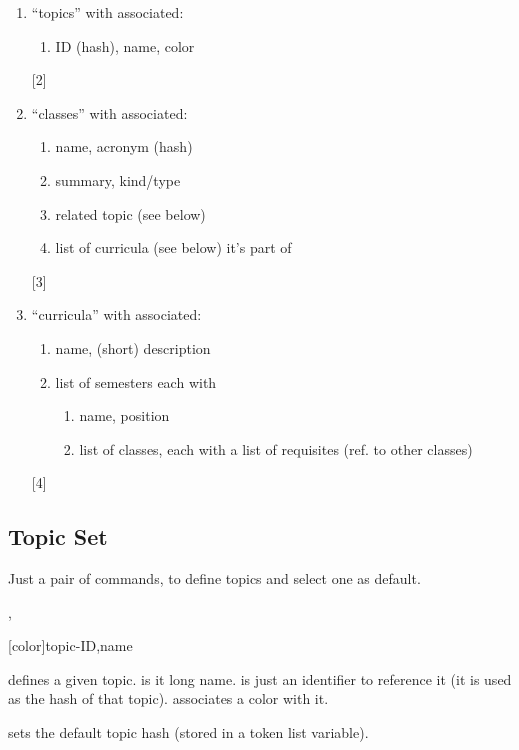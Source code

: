 \documentclass[10pt]{article}
\begin{document}
\begin{enumerate}
  \item ``topics'' with associated:
\begin{enumerate}
  \item ID (hash), name, color
\end{enumerate}
[2]
  
  \item ``classes'' with associated:
\begin{enumerate}
  \item name, acronym (hash)
  \item summary, kind/type
  \item related topic (see below)
  \item list of curricula (see below) it's part of
\end{enumerate}
[3]

  \item ``curricula'' with associated:
\begin{enumerate}
  \item name, (short) description
  \item list of semesters each with
  \begin{enumerate}
    \item name, position
    \item list of classes, each with a list of requisites (ref. to other classes)
  \end{enumerate}
\end{enumerate}
[4]
  
\end{enumerate}



\subsection{Topic Set}\label{topic}
Just a pair of commands, to define topics and select one as default.
\begin{codedescribe}{\topicdef,}
\begin{codesyntax}
  \tsmacro{\topicdef}[color]{topic-ID,name}
\end{codesyntax}
  \tsobj{\topicdef} defines a given topic.  is it long name.  is just an identifier to reference it (it is used as the  hash of that topic).  associates a color with it.
  
   sets the default topic hash (stored in a token list variable).
\end{codedescribe}
\end{document}
